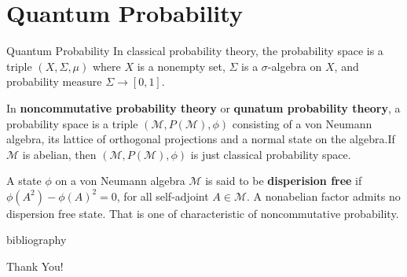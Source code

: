 \documentclass{beamer}
\begin{document}
\section{Quantum Probability}
\begin{frame}{Quantum Probability}
    \cite[p.8]{redei2006quantumprobabilitytheory} In classical probability theory, the probability space is a triple \((X,\Sigma,\mu)\) where \(X\) is a nonempty set, \(\Sigma\) is a \(\sigma\)-algebra on \(X\), and probability measure \(\Sigma \to [0,1]\).\pause
    
    In \textbf{noncommutative probability theory} or \textbf{qunatum probability theory}, a probability space is a triple \((\mathcal{M},P(\mathcal{M}),\phi)\) consisting of a von Neumann algebra, its lattice of orthogonal projections and a normal state on the algebra.\pause If \(\mathcal{M}\) is abelian, then \((\mathcal{M},P(\mathcal{M}),\phi)\) is just classical probability space.\pause
    
    A state \(\phi\) on a von Neumann algebra \(\mathcal{M}\) is said to be \textbf{disperision free} if \(\phi(A^2)-\phi(A)^2=0\), for all self-adjoint \(A \in \mathcal{M}\). A nonabelian factor admits no dispersion free state. That is one of characteristic of noncommutative probability.
\end{frame}
\begin{frame}{bibliography}
    
    
\end{frame}

\begin{frame}
\begin{center}
    \Huge{Thank You!}
\end{center}
\end{frame}
\end{document}
